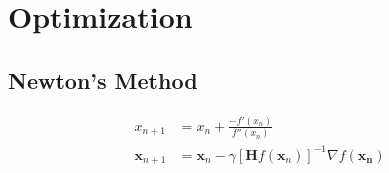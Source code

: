 \chapter{Optimization}
\section{Newton's Method}
\begin{align}
   x_{n+1} &= x_n + \frac{-f'(x_n)}{f''(x_n)} \\
   \bm{x}_{n+1} &= \bm{x}_n - \gamma[\bm{H} f(\bm{x}_n)]^{-1} \nabla f(\bm{x_n})
\end{align}
